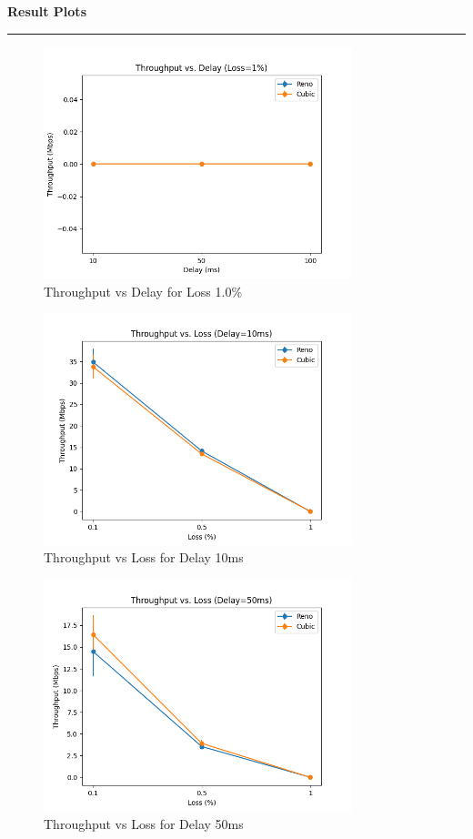 \documentclass[a4paper,12pt]{article}
\newenvironment{solution}[2][]{%
    \begin{mdframed}[linecolor=blue!70!black, linewidth=2pt, roundcorner=10pt, backgroundcolor=yellow!10!white, skipabove=12pt, skipbelow=12pt]%
        \textbf{\large #2}
        \par\noindent\rule{\textwidth}{0.4pt}
}{
    \end{mdframed}
}
\begin{document}
\begin{solution}{Result Plots}
    \begin{figure}[H]
        \centering
        \includegraphics[width=0.8\textwidth]{throughput_vs_delay_loss_1.png}
        \caption{Throughput vs Delay for Loss  1.0\%}
    \end{figure}

    

    \begin{figure}[H]
        \centering
        \includegraphics[width=0.8\textwidth]{throughput_vs_loss_delay_10ms.png}
        \caption{Throughput vs Loss for Delay 10ms}
    \end{figure}

    \begin{figure}[H]
        \centering
        \includegraphics[width=0.8\textwidth]{throughput_vs_loss_delay_50ms.png}
        \caption{Throughput vs Loss for Delay 50ms}
    \end{figure}


\end{solution}
\end{document}
